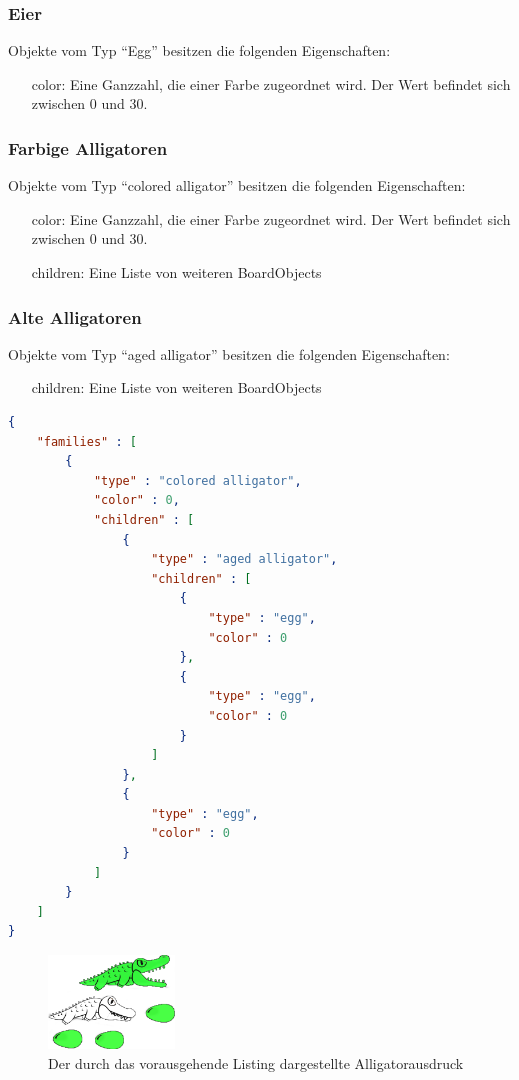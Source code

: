 \subsubsection{Eier}
Objekte vom Typ "`Egg"' besitzen die folgenden Eigenschaften:
\begin{itemize}
	\item[color:] Eine Ganzzahl, die einer Farbe zugeordnet wird. Der Wert befindet sich zwischen 0 und 30.
\end{itemize}

\subsubsection{Farbige Alligatoren}
Objekte vom Typ "`colored alligator"' besitzen die folgenden Eigenschaften:
\begin{itemize}
	\item[color:] Eine Ganzzahl, die einer Farbe zugeordnet wird. Der Wert befindet sich zwischen 0 und 30.
	\item[children:] Eine Liste von weiteren BoardObjects
\end{itemize}

\subsubsection{Alte Alligatoren}
Objekte vom Typ "`aged alligator"' besitzen die folgenden Eigenschaften:
\begin{itemize}
	\item[children:] Eine Liste von weiteren BoardObjects
\end{itemize}

\begin{lstlisting}[language=json,caption={Ein einfaches Board mit allen existierenden BoardObjects}]
{
	"families" : [
		{
			"type" : "colored alligator",
			"color" : 0,
			"children" : [
				{
					"type" : "aged alligator",
					"children" : [
						{
							"type" : "egg",
							"color" : 0
						},
						{
							"type" : "egg",
							"color" : 0
						}
					]
				},
				{
					"type" : "egg",
					"color" : 0
				}
			]
		}
	]
}
\end{lstlisting}
	
\begin{figure}[h]
	\caption{Der durch das vorausgehende Listing dargestellte Alligatorausdruck}
	\begin{center}
		\includegraphics[width=0.3\textwidth]{../assets/lx.((x x) x).png}
	\end{center}
\end{figure}

